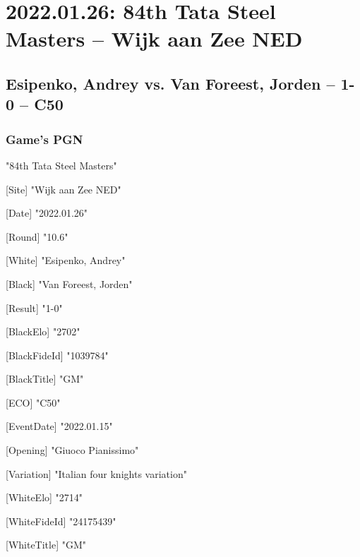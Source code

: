 \documentclass[9pt]{extarticle}
\begin{document}
\setlength{\columnsep}{32pt}
\section*{2022.01.26: 84th Tata Steel Masters -- Wijk aan Zee NED}

\subsection*{Esipenko, Andrey vs. Van Foreest, Jorden -- 1-0 -- C50}
\subsubsection*{Game's PGN}
\begin{multicols}{2}
\begin{flushleft}
[Event] "84th Tata Steel Masters"

[Site] "Wijk aan Zee NED"

[Date] "2022.01.26"

[Round] "10.6"

[White] "Esipenko, Andrey"

[Black] "Van Foreest, Jorden"

[Result] "1-0"

[BlackElo] "2702"

[BlackFideId] "1039784"

[BlackTitle] "GM"

[ECO] "C50"

[EventDate] "2022.01.15"

[Opening] "Giuoco Pianissimo"

[Variation] "Italian four knights variation"

[WhiteElo] "2714"

[WhiteFideId] "24175439"

[WhiteTitle] "GM"


\end{flushleft}
\end{multicols}
\end{document}

